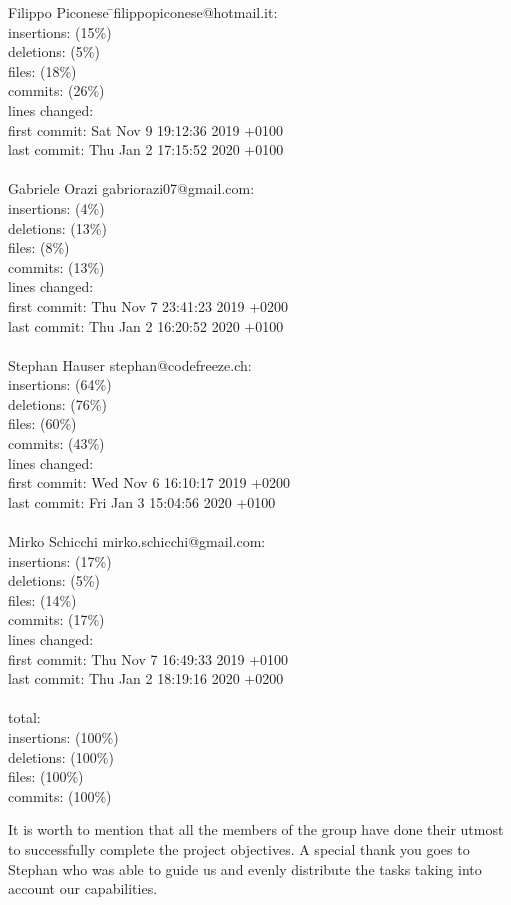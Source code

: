 \begin{tabbing}
  Filippo Piconese \= \textlangle{}filippopiconese@hotmail.it\textrangle{}:\\
  insertions:  (15\%)\\
  deletions:  (5\%)\\
  files:  (18\%)\\
  commits:  (26\%)\\
  lines changed: \\
  first commit: \> Sat Nov 9 19:12:36 2019 +0100\\
  last commit: \> Thu Jan 2 17:15:52 2020 +0100\\
  \\
  Gabriele Orazi \> \textlangle{}gabriorazi07@gmail.com\textrangle{}:\\
  insertions:  (4\%)\\
  deletions:  (13\%)\\
  files:  (8\%)\\
  commits:  (13\%)\\
  lines changed: \\
  first commit: \> Thu Nov 7 23:41:23 2019 +0200\\
  last commit: \> Thu Jan 2 16:20:52 2020 +0100\\
  \\
  Stephan Hauser \> \textlangle{}stephan@codefreeze.ch\textrangle{}:\\
  insertions:  (64\%)\\
  deletions:  (76\%)\\
  files:  (60\%)\\
  commits:  (43\%)\\
  lines changed: \\
  first commit: \> Wed Nov 6 16:10:17 2019 +0200\\
  last commit: \> Fri Jan 3 15:04:56 2020 +0100\\
  \\
  Mirko Schicchi \> \textlangle{}mirko.schicchi@gmail.com\textrangle{}:\\
  insertions:  (17\%)\\
  deletions:  (5\%)\\
  files:  (14\%)\\
  commits:  (17\%)\\
  lines changed: \\
  first commit: \> Thu Nov 7 16:49:33 2019 +0100\\
  last commit: \> Thu Jan 2 18:19:16 2020 +0200\\
  \\
  total:\\
  insertions:  (100\%)\\
  deletions:  (100\%)\\
  files:  (100\%)\\
  commits:  (100\%)\\
\end{tabbing}
It is worth to mention that all the members of the group have done their utmost to successfully complete the project objectives.\newline
A special thank you goes to Stephan who was able to guide us and evenly distribute the tasks taking into account our capabilities.
